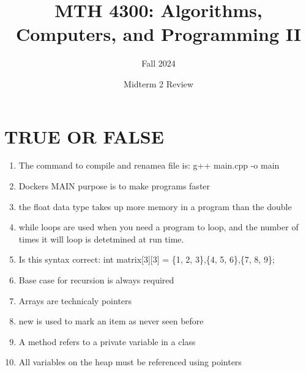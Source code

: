 \documentclass[a4paper]{article}
\title{MTH 4300: Algorithms, Computers, and Programming II}
\author{Fall 2024}
\date{Midterm 2 Review}
\begin{document}
\maketitle


\section{TRUE OR FALSE}
\begin{enumerate}
    \item The command to compile and renamea file is: g++ main.cpp -o main
    \item Dockers MAIN purpose is to make programs faster
    \item the float data type takes up more memory in a program than the double
    \item while loops are used when you need a program to loop, 
          and the number of times it will loop is detetmined at run time.
    \item Is this syntax correct: int matrix[3][3] = \{1, 2, 3\},\{4, 5, 6\},\{7, 8, 9\};
    \item Base case for recursion is always required
    \item Arrays are technicaly pointers
    \item new is used to mark an item as never seen before
    \item A method refers to a private variable in a class
    \item All variables on the heap must be referenced using pointers
\end{enumerate}
\newpage
\end{document}
